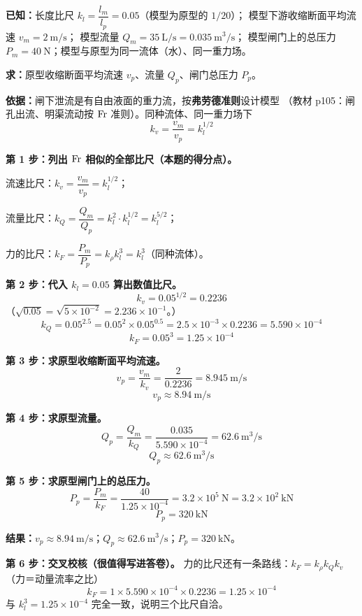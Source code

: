 \begin{jie}
\textbf{已知：}长度比尺 $k_l=\dfrac{l_m}{l_p}=0.05$（模型为原型的 $1/20$）；
模型下游收缩断面平均流速 $v_m=2\ \mathrm{m/s}$；
模型流量 $Q_m=35\ \mathrm{L/s}=0.035\ \mathrm{m^{3}/s}$；
模型闸门上的总压力 $P_m=40\ \mathrm{N}$；模型与原型为同一流体（水）、同一重力场。

\textbf{求：}原型收缩断面平均流速 $v_p$、流量 $Q_p$、闸门总压力 $P_p$。

\textbf{依据：}闸下泄流是有自由液面的重力流，按\textbf{弗劳德准则}设计模型
（教材 p105：闸孔出流、明渠流动按 $\mathrm{Fr}$ 准则）。同种流体、同一重力场下
\[ k_v=\frac{v_m}{v_p}=k_l^{1/2} \]

\textbf{第 1 步：列出 $\mathrm{Fr}$ 相似的全部比尺（本题的得分点）。}
\begin{xiaowen}
\item 流速比尺：$k_v=\dfrac{v_m}{v_p}=k_l^{1/2}$；
\item 流量比尺：$k_Q=\dfrac{Q_m}{Q_p}=k_l^{2}\cdot k_l^{1/2}=k_l^{5/2}$；
\item 力的比尺：$k_F=\dfrac{P_m}{P_p}=k_\rho k_l^{3}=k_l^{3}$（同种流体）。
\end{xiaowen}

\textbf{第 2 步：代入 $k_l=0.05$ 算出数值比尺。}
\[ k_v=0.05^{1/2}=0.2236 \]
（$\sqrt{0.05}=\sqrt{5\times10^{-2}}=2.236\times10^{-1}$。）
\[ k_Q=0.05^{2.5}=0.05^{2}\times0.05^{0.5}=2.5\times10^{-3}\times0.2236=5.590\times10^{-4} \]
\[ k_F=0.05^{3}=1.25\times10^{-4} \]

\textbf{第 3 步：求原型收缩断面平均流速。}
\[ v_p=\frac{v_m}{k_v}=\frac{2}{0.2236}=8.945\ \mathrm{m/s} \]
\[ \boxed{v_p\approx8.94\ \mathrm{m/s}} \]

\textbf{第 4 步：求原型流量。}
\[ Q_p=\frac{Q_m}{k_Q}=\frac{0.035}{5.590\times10^{-4}}=62.6\ \mathrm{m^{3}/s} \]
\[ \boxed{Q_p\approx62.6\ \mathrm{m^{3}/s}} \]

\textbf{第 5 步：求原型闸门上的总压力。}
\[ P_p=\frac{P_m}{k_F}=\frac{40}{1.25\times10^{-4}}=3.2\times10^{5}\ \mathrm{N}=3.2\times10^{2}\ \mathrm{kN} \]
\[ \boxed{P_p=320\ \mathrm{kN}} \]

\textbf{结果：}$v_p\approx8.94\ \mathrm{m/s}$；$Q_p\approx62.6\ \mathrm{m^{3}/s}$；$P_p=320\ \mathrm{kN}$。

\textbf{第 6 步：交叉校核（很值得写进答卷）。}
力的比尺还有一条路线：$k_F=k_\rho k_Q k_v$（力＝动量流率之比）
\[ k_F=1\times5.590\times10^{-4}\times0.2236=1.25\times10^{-4} \]
与 $k_l^{3}=1.25\times10^{-4}$ 完全一致，说明三个比尺自洽。


\end{jie}
